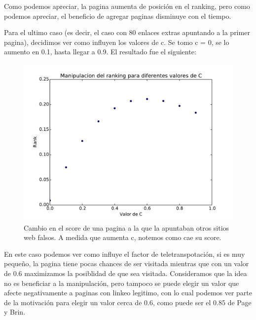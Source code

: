 Como podemos apreciar, la pagina aumenta de posición en el ranking, pero como podemos apreciar, el beneficio de agregar paginas disminuye con el tiempo.

Para el ultimo caso (es decir, el caso con 80 enlaces extras apuntando a la primer pagina), decidimos ver como influyen los valores de c. Se tomo c = 0, se lo aumento en 0.1, hasta llegar a 0.9. El resultado fue el siguiente:

\begin{figure}[H]
\centering
\includegraphics[scale=0.7]{images/manipulacionC.pdf}
\caption{Cambio en el score de una pagina a la que la apuntaban otros sitios web falsos. A medida que aumenta c, notemos como cae su score.}
\label{timePageRank}
\end{figure}

En este caso podemos ver como influye el factor de teletranspotación, si es muy pequeño, la pagina tiene pocas chances de ser visitada mientras que con un valor de 0.6 maximizamos la posiblidad de que sea visitada. Consideramos que la idea no es beneficiar a la manipulación, pero tampoco se puede elegir un valor que afecte negativamente a paginas con linkeo legitimo, con lo cual podemos ver parte de la motivación para elegir un valor cerca de 0.6, como puede ser el 0.85 de Page y Brin.
